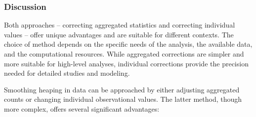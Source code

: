 \documentclass[pdflatex,sn-mathphys-num]{sn-jnl}%
\theoremstyle{thmstyleone}%
\theoremstyle{thmstyletwo}%
\theoremstyle{thmstylethree}%
\begin{document}
\subsubsection{Discussion}

Both approaches -- correcting aggregated statistics and correcting individual values -- offer unique advantages and are suitable for different contexts. The choice of method depends on the specific needs of the analysis, the available data, and the computational resources. While aggregated corrections are simpler and more suitable for high-level analyses, individual corrections provide the precision needed for detailed studies and modeling.

Smoothing heaping in data can be approached by either adjusting aggregated counts or changing individual observational values. The latter method, though more complex, offers several significant advantages:
\end{document}
